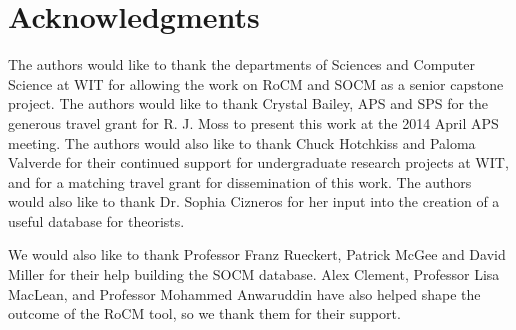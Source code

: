 \documentclass[conference]{IEEEtran-modified}
\begin{document}



\section*{Acknowledgments}
The authors would like to thank the departments of Sciences and Computer Science at WIT for allowing the work on RoCM and SOCM as a senior capstone project. The authors would like to thank Crystal Bailey, APS and SPS for the generous travel grant for R. J. Moss to present this work at the 2014 April APS meeting. The authors would also like to thank Chuck Hotchkiss and Paloma Valverde for their continued support for undergraduate research projects at WIT, and for a matching travel grant for dissemination of this work. The authors would also like to thank Dr. Sophia Cizneros for her input into the creation of a useful database for theorists.

We would also like to thank Professor Franz Rueckert, Patrick McGee and David Miller for their help building the SOCM database. Alex Clement, Professor Lisa MacLean, and Professor Mohammed Anwaruddin have also helped shape the outcome of the RoCM tool, so we thank them for their support.






\hspace{\textwidth}
\end{document}
